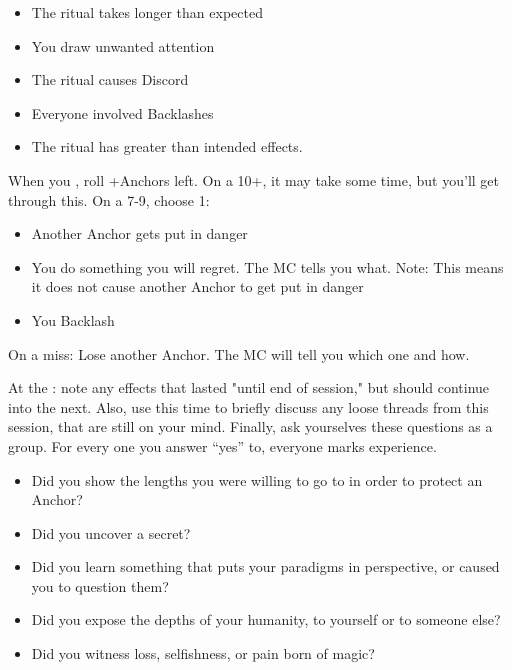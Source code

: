 \begin{multicols}{3}
\begin{move}
    \begin{itemize}
      \setlength\itemsep{0em}
    \item The ritual takes longer than expected
    \item You draw unwanted attention
    \item The ritual causes Discord
    \item Everyone involved Backlashes
    \item The ritual has greater than intended effects.
    \end{itemize}

  \end{move}

  \SEPARATOR

  \begin{move}
    When you , roll +Anchors left. On a 10+, it may take some time, but you’ll get through this. On a 7-9, choose 1:

    \begin{itemize}
      \setlength\itemsep{0em}
    \item Another Anchor gets put in danger
    \item You do something you will regret. The MC tells you what. Note: This means it does not cause another Anchor to get put in danger
    \item You Backlash 
    \end{itemize}
On a miss: Lose another Anchor. The MC will tell you which one and how.

  \end{move}

  \columnbreak

  \begin{move}
    At the : note any effects that lasted "until end of session," but should continue into the next. Also, use this time to briefly discuss any loose threads from this session, that are still on your mind. Finally, ask yourselves these questions as a group. For every one you answer “yes” to, everyone marks experience.

    \begin{itemize}
      \setlength\itemsep{0em}
    \item Did you show the lengths you were willing to go to in order to protect an Anchor?  
    \item Did you uncover a secret?  
    \item Did you learn something that puts your paradigms in perspective, or caused you to question them?  
    \item Did you expose the depths of your humanity, to yourself or to someone else?  
    \item Did you witness loss, selfishness, or pain born of magic?
    \end{itemize}


\end{move}
\end{multicols}

